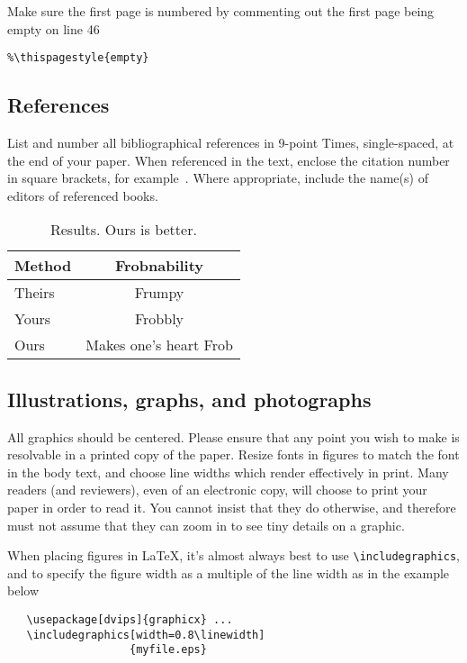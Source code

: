 \documentclass[10pt,twocolumn,letterpaper]{article}
\begin{document}
Make sure the first page is numbered by commenting out the first page being
empty on line 46
\begin{verbatim}
%\thispagestyle{empty}
\end{verbatim}


\subsection{References}

List and number all bibliographical references in 9-point Times,
single-spaced, at the end of your paper. When referenced in the text,
enclose the citation number in square brackets, for
example~\cite{Authors14}.  Where appropriate, include the name(s) of
editors of referenced books.

\begin{table}
\begin{center}
\begin{tabular}{|l|c|}
\hline
Method & Frobnability \\
\hline\hline
Theirs & Frumpy \\
Yours & Frobbly \\
Ours & Makes one's heart Frob\\
\hline
\end{tabular}
\end{center}
\caption{Results. Ours is better.}
\label{mytable}
\end{table}

\subsection{Illustrations, graphs, and photographs}

All graphics should be centered.  Please ensure that any point you wish to make is resolvable in a printed copy of the paper.  Resize fonts in figures to match the font in the body text, and choose line widths which render effectively in print.  Many readers (and reviewers), even of an electronic copy, will choose to print your paper in order to read it.  You cannot
insist that they do otherwise, and therefore must not assume that they can
zoom in to see tiny details on a graphic.

When placing figures in \LaTeX, it's almost always best to use
\verb+\includegraphics+, and to specify the  figure width as a multiple of
the line width as in the example below
{\small\begin{verbatim}
   \usepackage[dvips]{graphicx} ...
   \includegraphics[width=0.8\linewidth]
                   {myfile.eps}
\end{verbatim}
}

{\small


}
\end{document}
